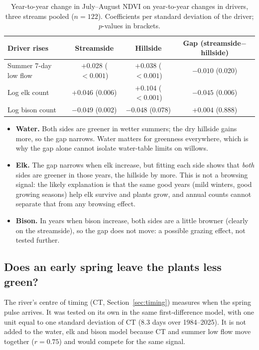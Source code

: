 \documentclass[11pt,a4paper]{article}
\begin{document}
\begin{table}[H]
\centering\small
\caption{Year-to-year change in July--August NDVI on year-to-year changes in drivers, three streams pooled ($n=122$). Coefficients per standard deviation of the driver; $p$-values in brackets.}\label{tab:fd}
\begin{tabular}{@{}lccc@{}}
\toprule
Driver rises & Streamside & Hillside & Gap (streamside$-$hillside) \\
\midrule
Summer 7-day low flow & $+0.028$ ($<0.001$) & $+0.038$ ($<0.001$) & $-0.010$ (0.020) \\
Log elk count & $+0.046$ (0.006) & $+0.104$ ($<0.001$) & $-0.045$ (0.006) \\
Log bison count & $-0.049$ (0.002) & $-0.048$ (0.078) & $+0.004$ (0.888) \\
\bottomrule
\end{tabular}
\end{table}

\begin{itemize}
\item \textbf{Water.} Both sides are greener in wetter summers; the dry hillside gains more, so the gap narrows. Water matters for greenness everywhere, which is why the gap alone cannot isolate water-table limits on willows.
\item \textbf{Elk.} The gap narrows when elk increase, but fitting each side shows that \emph{both} sides are greener in those years, the hillside by more. This is not a browsing signal: the likely explanation is that the same good years (mild winters, good growing seasons) help elk survive and plants grow, and annual counts cannot separate that from any browsing effect.
\item \textbf{Bison.} In years when bison increase, both sides are a little browner (clearly on the streamside), so the gap does not move: a possible grazing effect, not tested further.
\end{itemize}

\subsection{Does an early spring leave the plants less green?}
The river's centre of timing (CT, Section~\ref{sec:timing}) measures when the spring pulse arrives. It was tested on its own in the same first-difference model, with one unit equal to one standard deviation of CT (8.3 days over 1984--2025). It is not added to the water, elk and bison model because CT and summer low flow move together ($r=0.75$) and would compete for the same signal.
\end{document}
